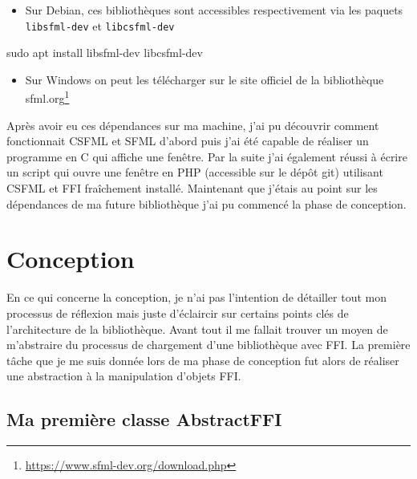 \documentclass[11pt,a4paper,krantz2,11pt,oneside]{krantz}
\newenvironment{Shaded}{\begin{snugshade}}{\end{snugshade}}
\newcommand{\FunctionTok}[1]{\textcolor[rgb]{0,0,0}{#1}}
\newcommand{\NormalTok}[1]{#1}
\providecommand{\tightlist}{%
  \setlength{\itemsep}{0pt}\setlength{\parskip}{0pt}}
\renewcommand{\href}[2]{#2\footnote{\url{#1}}}
\begin{document}
\begin{itemize}
\tightlist
\item
  Sur Debian, ces bibliothèques sont accessibles respectivement via les paquets \texttt{libsfml-dev} et \texttt{libcsfml-dev}
\end{itemize}

\begin{Shaded}
\begin{Highlighting}[]
\FunctionTok{sudo}\NormalTok{ apt install libsfml-dev libcsfml-dev}
\end{Highlighting}
\end{Shaded}

\begin{itemize}
\tightlist
\item
  Sur Windows on peut les télécharger sur le site officiel de la bibliothèque \href{https://www.sfml-dev.org/download.php}{sfml.org}
\end{itemize}

Après avoir eu ces dépendances sur ma machine, j'ai pu découvrir comment fonctionnait CSFML et SFML d'abord puis j'ai été capable de réaliser un programme en C qui affiche une fenêtre. Par la suite j'ai également réussi à écrire un script qui ouvre une fenêtre en PHP (accessible sur le dépôt git) utilisant CSFML et FFI fraîchement installé. Maintenant que j'étais au point sur les dépendances de ma future bibliothèque j'ai pu commencé la phase de conception.

\hypertarget{conception}{%
\section{Conception}\label{conception}}

En ce qui concerne la conception, je n'ai pas l'intention de détailler tout mon processus de réflexion mais juste d'éclaircir sur certains points clés de l'architecture de la bibliothèque. Avant tout il me fallait trouver un moyen de m'abstraire du processus de chargement d'une bibliothèque avec FFI. La première tâche que je me suis donnée lors de ma phase de conception fut alors de réaliser une abstraction à la manipulation d'objets FFI.

\hypertarget{ma-premiuxe8re-classe-abstractffi}{%
\subsection{Ma première classe AbstractFFI}\label{ma-premiuxe8re-classe-abstractffi}}
\end{document}
